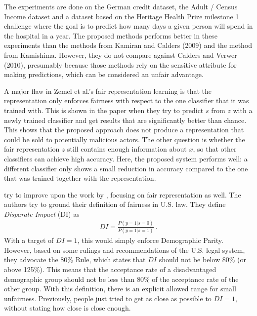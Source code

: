 The experiments are done on the German credit dataset, the Adult / Census Income dataset
and a dataset based on the Heritage Health Prize milestone 1 challenge
where the goal is to predict how many days a given person will spend in the hospital in a year.
The proposed methods performs better in these experiments
than the methods from Kamiran and Calders (2009) and the method from Kamishima.
However, they do not compare against Calders and Verwer (2010),
presumably because those methods rely on the sensitive attribute for making predictions,
which can be considered an unfair advantage.

A major flaw in Zemel et al.'s fair representation learning is
that the representation only enforces fairness
with respect to the one classifier that it was trained with.
This is shown in the paper when they try to predict \(s\) from \(z\) with a newly trained classifier
and get results that are significantly better than chance.
This shows that the proposed approach does not produce a representation
that could be sold to potentially malicious actors.
The other question is
whether the fair representation \(z\) still contains enough information about \(x\),
so that other classifiers can achieve high accuracy.
Here, the proposed system performs well:
a different classifier only shows a small reduction in accuracy
compared to the one that was trained together with the representation.

\citet{feldman2015certifying} try to improve upon the work by \citet{zemel2013learning},
focusing on fair representation as well.
The authors try to ground their definition of fairness in U.S. law.
They define \emph{Disparate Impact} (DI) as
\begin{align}
  \label{eq:disparate-impace}
  DI = \frac{P(y=1|s=0)}{P(y=1|s=1)} ~.
\end{align}
With a target of \(DI = 1\), this would simply enforce Demographic Parity.
However, based on some rulings and recommendations of the U.S. legal system,
they advocate the 80\% Rule, which states that \(DI\) should not be below 80\% (or above 125\%).
This means that the acceptance rate of a disadvantaged demographic group
should not be less than 80\% of the acceptance rate of the other group.
With this definition, there is an explicit allowed range for small unfairness.
Previously, people just tried to get as close as possible to \(DI = 1\),
without stating how close is close enough.

